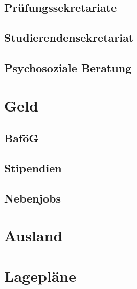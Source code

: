 \documentclass[12pt, a4paper]{article}
\newif\ifinfo
\begin{document}
	\subsection{Prüfungssekretariate}
	

	\subsection{Studierendensekretariat}
	

	\subsection{Psychosoziale Beratung}
	
\fi

\newpage
\section{Geld}

\subsection{BaföG}


\subsection{Stipendien}


\subsection{Nebenjobs}


\ifinfo
	\newpage
\fi

\section{Ausland}


\newpage
%

\section{Lagepläne}
\ifinfo
	
\else
	
\fi
\newpage
\end{document}
